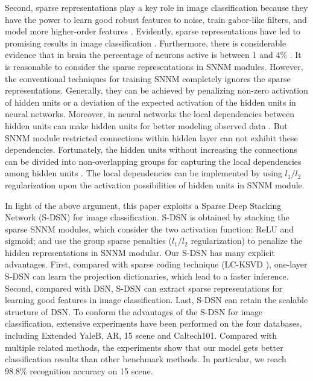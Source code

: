 \documentclass[letterpaper]{article}
\begin{document}
Second, sparse representations play a key role in image classification because they have the power to learn good robust features to noise, train gabor-like filters, and model more higher-order features \cite{Ranzato2007,Lee2008}. Evidently, sparse representations have led to promising results in image classification \cite{Jiang2013}. Furthermore, there is considerable evidence that in brain the percentage of neurons active is between 1 and 4\% \cite{Lennie2003}. It is reasonable to consider the sparse representations in SNNM modules. However, the conventional techniques for training SNNM completely ignores the sparse representations. Generally, they can be achieved by penalizing non-zero activation of hidden units \cite{Ranzato2008} or a deviation of the expected activation of the hidden units \cite{Lee2008} in neural networks.
Moreover, in neural networks the local dependencies between hidden units can make hidden units for better modeling observed data \cite{Luo2011}. But SNNM module restricted connections within hidden layer can not exhibit these dependencies. Fortunately, the hidden units without increasing the connections can be divided into non-overlapping groups for capturing the local dependencies among hidden units \cite{Luo2011}. The local dependencies can be implemented by using $l_1/l_2$ regularization upon the activation possibilities of hidden units in SNNM module.

In light of the above argument, this paper exploits a Sparse Deep Stacking Network (S-DSN) for image classification. S-DSN is obtained by stacking the sparse SNNM modules, which consider the two activation function: ReLU and sigmoid; and use the group sparse penalties ($l_1/l_2$ regularization) to penalize the hidden representations in SNNM modular. Our S-DSN has many explicit advantages. First, compared with sparse coding technique (LC-KSVD \cite{Jiang2013}), one-layer S-DSN can learn the projection dictionaries, which lead to a faster inference. Second, compared with DSN, S-DSN can extract sparse representations for learning good features in image classification. Last, S-DSN can retain the scalable structure of DSN. To conform the advantages of the S-DSN for image classification, extensive experiments have been performed on the four databases, including Extended YaleB, AR, 15 scene and Caltech101. Compared with multiple related methods, the experiments show that our model gets better classification results than other benchmark methods. In particular, we reach $98.8\%$ recognition accuracy on 15 scene.
\end{document}
